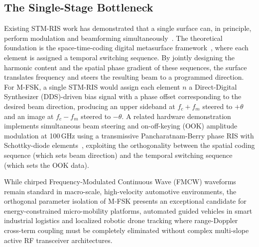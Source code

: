 \documentclass[journal]{IEEEtran}
\begin{document}
\subsection{The Single-Stage Bottleneck}
Existing STM-RIS work has demonstrated that a single surface can, in
principle, perform modulation and beamforming
simultaneously~\cite{zhang2018space,zhang2019breaking,dai2018independent}.
The theoretical foundation is the space-time-coding digital metasurface
framework~\cite{zhang2018space}, where each element is assigned a
temporal switching sequence. By jointly designing the harmonic content and
the spatial phase gradient of these sequences, the surface translates
frequency and steers the resulting beam to a programmed direction. For
M-FSK, a single STM-RIS would assign each element $n$ a Direct-Digital Synthesizer (DDS)-driven bias
signal with a phase offset corresponding to the desired beam direction,
producing an upper sideband at $f_c + f_m$ steered to $+\theta$ and an image
at $f_c - f_m$ steered to $-\theta$. A related hardware demonstration
implements simultaneous beam steering and on-off-keying (OOK) amplitude
modulation at 100\,GHz using a transmissive Pancharatnam-Berry phase RIS
with Schottky-diode elements~\cite{shen2025sub}, exploiting
the orthogonality between the spatial coding sequence (which sets beam
direction) and the temporal switching sequence (which sets the OOK data).

While chirped Frequency-Modulated Continuous Wave (FMCW) waveforms remain standard in macro-scale, high-velocity automotive environments, the orthogonal parameter isolation of M-FSK presents an exceptional candidate for energy-constrained micro-mobility platforms, automated guided vehicles in smart industrial logistics and localized robotic drone tracking where range-Doppler cross-term coupling must be completely eliminated without complex multi-slope active RF transceiver architectures.
\end{document}
